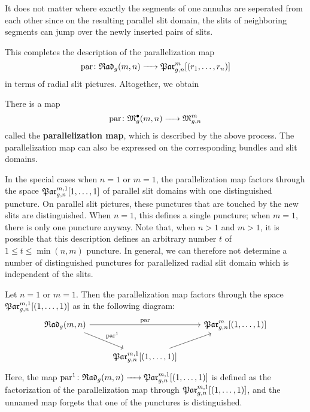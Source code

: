 \begin{rem}
 It does not matter where exactly the segments of one annulus are seperated from each other
 since on the resulting parallel slit domain, the slits of neighboring segments can jump over the newly inserted pairs of slits. 
\end{rem}

This completes the description of the parallelization map 
\[
   \parmap \colon \Rad \to \Parr
\]
in terms of radial slit pictures.
Altogether, we obtain

\begin{defi}
   There is a map 
   \[
      \operatorname{par} \colon \mathfrak{M}^\bullet_g(m, n) \xrightarrow{\hspace{6pt}{}\hspace{6pt}} \mathfrak{M}^m_{g,n}
   \]
   called the \textbf{parallelization map}, which is described by the above process.
   The parallelization map can also be expressed on the corresponding bundles and slit domains.
\end{defi}

In the special cases when $n = 1$ or $m = 1$, the parallelization map factors through the space $\mathfrak{Par}_{g, n}^{m, 1} [1, \dotsc, 1]$ of parallel slit domains with one distinguished puncture.
On parallel slit pictures, these punctures that are touched by the new slits are distinguished.
When $n = 1$, this defines a single puncture; when $m = 1$, there is only one puncture anyway.
Note that, when $n > 1$ and $m > 1$, it is possible that this description defines an arbitrary number $t$ of $1 \leq t \leq \min(n, m)$ puncture.
In general, we can therefore not determine a number of distinguished punctures for parallelized radial slit domain which is independent of the slits.

\begin{prop}\label{par_factors}
   Let $n = 1$ or $m = 1$.
   Then the parallelization map factors through the space $\mathfrak{Par}_{g, n}^{m, 1}[(1, \dotsc, 1)]$ as in the following diagram:
   \[
    \begin{tikzcd}
	\Rad \arrow{rr}{\parmap} \arrow{rd}{\parmap^{1}} &                     & \Par_{g, n}^{m}[(1, \dotsc, 1)] \\
	                     &  \arrow{ru} \Par_{g, n}^{m, 1}[(1, \dotsc, 1)]&
    \end{tikzcd}
   \]
   Here, the map $\operatorname{par}^{1} \colon {\mathfrak{Rad}_g(m,n)} \xrightarrow{\hspace{6pt}{}\hspace{6pt}} \mathfrak{Par}_{g, n}^{m, 1}[(1, \dotsc, 1)]$ is defined as the factorization of the parallelization map through $\mathfrak{Par}_{g, n}^{m, 1}[(1, \dotsc, 1)]$,
   and the unnamed map forgets that one of the punctures is distinguished.
\end{prop}

